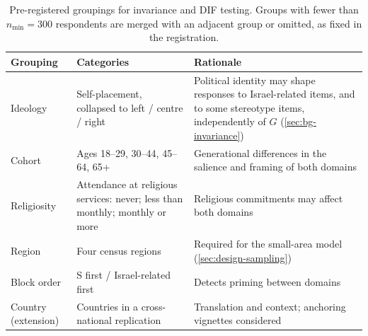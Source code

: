 \begin{table}[tbp]
\centering
\caption{Pre-registered groupings for invariance and DIF testing. Groups with fewer than $n_{\min}=300$ respondents are merged with an adjacent group or omitted, as fixed in the registration.}\label{tab:design-groups}
\footnotesize
\renewcommand{\arraystretch}{1.15}
\begin{tabularx}{\textwidth}{@{}l>{\raggedright\arraybackslash}X>{\raggedright\arraybackslash}X@{}}
\toprule
Grouping & Categories & Rationale \\
\midrule
Ideology & Self-placement, collapsed to left / centre / right & Political identity may shape responses to Israel-related items, and to some stereotype items, independently of $G$ (\cref{sec:bg-invariance}) \\
Cohort & Ages 18--29, 30--44, 45--64, 65+ & Generational differences in the salience and framing of both domains \\
Religiosity & Attendance at religious services: never; less than monthly; monthly or more & Religious commitments may affect both domains \\
Region & Four census regions & Required for the small-area model (\cref{sec:design-sampling}) \\
Block order & S first / Israel-related first & Detects priming between domains \\
Country (extension) & Countries in a cross-national replication & Translation and context; anchoring vignettes considered \citep{king2004} \\
\bottomrule
\end{tabularx}
\end{table}

